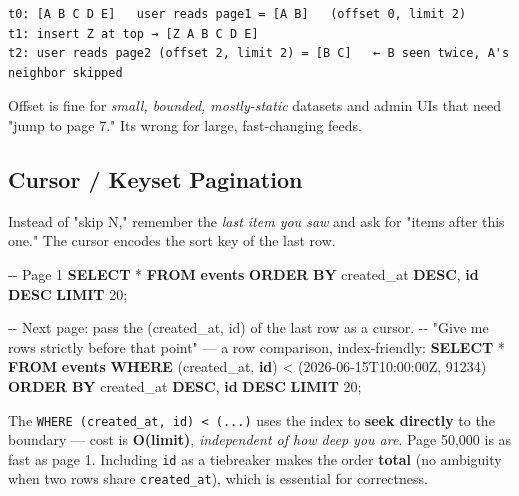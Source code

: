 \documentclass[11pt]{article}
\newenvironment{Shaded}{\begin{snugshade}}{\end{snugshade}}
\newcommand{\CommentTok}[1]{\textcolor[rgb]{0.48,0.49,0.49}{#1}}
\newcommand{\DecValTok}[1]{\textcolor[rgb]{0.96,0.45,0.00}{#1}}
\newcommand{\KeywordTok}[1]{\textcolor[rgb]{0.81,0.81,0.76}{\textbf{#1}}}
\newcommand{\NormalTok}[1]{\textcolor[rgb]{0.81,0.81,0.76}{#1}}
\newcommand{\OperatorTok}[1]{\textcolor[rgb]{0.81,0.81,0.76}{#1}}
\newcommand{\StringTok}[1]{\textcolor[rgb]{0.96,0.31,0.31}{#1}}
\begin{document}
\setcodelang{}

\begin{verbatim}
t0: [A B C D E]   user reads page1 = [A B]   (offset 0, limit 2)
t1: insert Z at top → [Z A B C D E]
t2: user reads page2 (offset 2, limit 2) = [B C]   ← B seen twice, A's neighbor skipped
\end{verbatim}

Offset is fine for \emph{small, bounded, mostly-static} datasets and admin UIs that need "jump to page 7." It\textquotesingle s wrong for large, fast-changing feeds.

\subsection{Cursor / Keyset Pagination}\label{cursor--keyset-pagination}

Instead of "skip N," remember the \emph{last item you saw} and ask for "items after this one." The cursor encodes the sort key of the last row.


\begin{Shaded}
\begin{Highlighting}[]
\CommentTok{{-}{-} Page 1}
\KeywordTok{SELECT} \OperatorTok{*} \KeywordTok{FROM} \KeywordTok{events}
\KeywordTok{ORDER} \KeywordTok{BY}\NormalTok{ created\_at }\KeywordTok{DESC}\NormalTok{, }\KeywordTok{id} \KeywordTok{DESC}
\KeywordTok{LIMIT} \DecValTok{20}\NormalTok{;}

\CommentTok{{-}{-} Next page: pass the (created\_at, id) of the last row as a cursor.}
\CommentTok{{-}{-} "Give me rows strictly before that point" — a row comparison, index{-}friendly:}
\KeywordTok{SELECT} \OperatorTok{*} \KeywordTok{FROM} \KeywordTok{events}
\KeywordTok{WHERE}\NormalTok{ (created\_at, }\KeywordTok{id}\NormalTok{) }\OperatorTok{\textless{}}\NormalTok{ (}\StringTok{\textquotesingle{}2026{-}06{-}15T10:00:00Z\textquotesingle{}}\NormalTok{, }\DecValTok{91234}\NormalTok{)}
\KeywordTok{ORDER} \KeywordTok{BY}\NormalTok{ created\_at }\KeywordTok{DESC}\NormalTok{, }\KeywordTok{id} \KeywordTok{DESC}
\KeywordTok{LIMIT} \DecValTok{20}\NormalTok{;}
\end{Highlighting}
\end{Shaded}

The \texttt{WHERE\ (created\_at,\ id)\ \textless{}\ (...)} uses the index to \textbf{seek directly} to the boundary --- cost is \textbf{O(limit)}, \emph{independent of how deep you are}. Page 50,000 is as fast as page 1. Including \texttt{id} as a tiebreaker makes the order \textbf{total} (no ambiguity when two rows share \texttt{created\_at}), which is essential for correctness.
\end{document}
